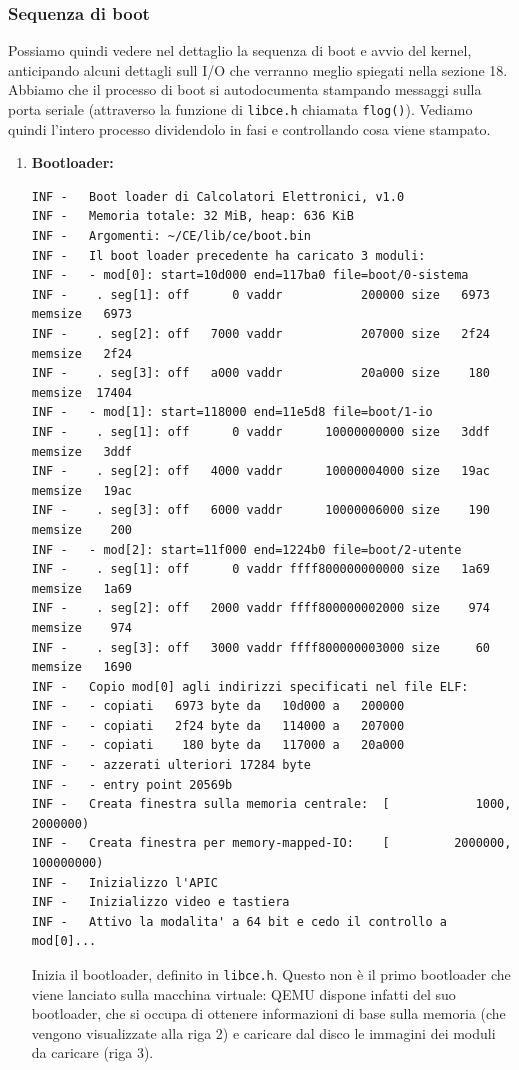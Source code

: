 \documentclass[a4paper,11pt]{article}
\begin{document}
\subsubsection{Sequenza di boot}
Possiamo quindi vedere nel dettaglio la sequenza di boot e avvio del kernel, anticipando alcuni dettagli sull I/O che verranno meglio spiegati nella sezione 18.
Abbiamo che il processo di boot si autodocumenta stampando messaggi sulla porta seriale (attraverso la funzione di \lstinline|libce.h| chiamata \lstinline|flog()|).
Vediamo quindi l'intero processo dividendolo in fasi e controllando cosa viene stampato.
\begin{enumerate}
	\item \textbf{Bootloader:}
\begin{lstlisting}[language={},style=codestyle]	
INF	-	Boot loader di Calcolatori Elettronici, v1.0
INF	-	Memoria totale: 32 MiB, heap: 636 KiB
INF	-	Argomenti: ~/CE/lib/ce/boot.bin 
INF	-	Il boot loader precedente ha caricato 3 moduli:
INF	-	- mod[0]: start=10d000 end=117ba0 file=boot/0-sistema
INF	-	 . seg[1]: off      0 vaddr           200000 size   6973 memsize   6973
INF	-	 . seg[2]: off   7000 vaddr           207000 size   2f24 memsize   2f24
INF	-	 . seg[3]: off   a000 vaddr           20a000 size    180 memsize  17404
INF	-	- mod[1]: start=118000 end=11e5d8 file=boot/1-io
INF	-	 . seg[1]: off      0 vaddr      10000000000 size   3ddf memsize   3ddf
INF	-	 . seg[2]: off   4000 vaddr      10000004000 size   19ac memsize   19ac
INF	-	 . seg[3]: off   6000 vaddr      10000006000 size    190 memsize    200
INF	-	- mod[2]: start=11f000 end=1224b0 file=boot/2-utente
INF	-	 . seg[1]: off      0 vaddr ffff800000000000 size   1a69 memsize   1a69
INF	-	 . seg[2]: off   2000 vaddr ffff800000002000 size    974 memsize    974
INF	-	 . seg[3]: off   3000 vaddr ffff800000003000 size     60 memsize   1690
INF	-	Copio mod[0] agli indirizzi specificati nel file ELF:
INF	-	- copiati   6973 byte da   10d000 a   200000
INF	-	- copiati   2f24 byte da   114000 a   207000
INF	-	- copiati    180 byte da   117000 a   20a000
INF	-	- azzerati ulteriori 17284 byte
INF	-	- entry point 20569b
INF	-	Creata finestra sulla memoria centrale:  [            1000,          2000000)
INF	-	Creata finestra per memory-mapped-IO:    [         2000000,        100000000)
INF	-	Inizializzo l'APIC
INF	-	Inizializzo video e tastiera
INF	-	Attivo la modalita' a 64 bit e cedo il controllo a mod[0]...
\end{lstlisting}

Inizia il bootloader, definito in \lstinline|libce.h|.
Questo non è il primo bootloader che viene lanciato sulla macchina virtuale: QEMU dispone infatti del suo bootloader, che si occupa di ottenere informazioni di base sulla memoria (che vengono visualizzate alla riga 2) e caricare dal disco le immagini dei moduli da caricare (riga 3).


\end{enumerate}
\end{document}
